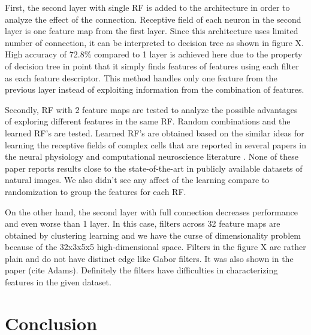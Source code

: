 \documentclass{article} %
\begin{document}
First, the second layer with single RF is added to the architecture in order to analyze the effect of the connection. Receptive field of each neuron in the second layer is one feature map from the first layer. Since this architecture uses limited number of connection, it can be interpreted to decision tree as shown in figure X. High accuracy of 72.8\% compared to 1 layer is achieved here due to the property of decision tree in point that it simply finds features of features using each filter as each feature descriptor. This method handles only one feature from the previous layer instead of exploiting information from the combination of features.

Secondly, RF with 2 feature maps are tested to analyze the possible advantages of exploring different features in the same RF. Random combinations and the learned RF's are tested. Learned RF's are obtained  based on the similar ideas for learning the receptive fields of complex cells that are reported in  several papers in the neural physiology and computational neuroscience literature  \cite{masquelier2007learning,spratling2005learning,wiskott2002slow,wallis1997invariant}. None of these paper reports results close to the state-of-the-art in publicly available datasets of natural images. We also didn't see any affect of the learning compare to randomization to group the features for each RF.

On the other hand, the second layer with full connection decreases performance and even worse than 1 layer. In this case, filters across 32 feature maps are obtained by clustering learning and we have the curse of dimensionality problem because of the 32x3x5x5 high-dimensional space. Filters in the figure X are rather plain and do not have distinct edge like Gabor filters. It was also shown in the paper (cite Adams). Definitely the filters have difficulties in characterizing features in the given dataset.

\section{Conclusion}
\label{sec-conc}

\end{document}
